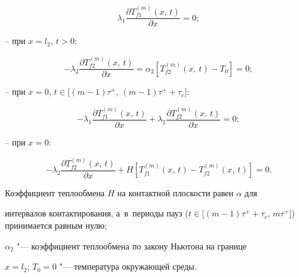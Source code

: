 \begin{equation}

\lambda _1 \frac{\partial T_{f1}^{(m)} (x,\,t)}{\partial x} = 0;

\end{equation}



-- при $x = l_2$, $t > 0$:



\begin{equation}

\label{evdok:eq2}

 - \lambda _2 \frac{\partial T_{f2}^{(m)} (x,\,t)}{\partial x} = \alpha _2 \left[T_{f2}^{(m)} (x,\,t) - T_0 \right] = 0;

\end{equation}



-- при $x = 0$, $t \in \big[(m - 1)\tau ^ +,\, (m - 1)\tau ^ + + \tau _c \big]$:

\begin{equation}

\label{evdok:eq3}

 - \lambda _1 \frac{\partial T_{f1}^{(m)} (x,\,t)}{\partial x} + 

\lambda _2 \frac{\partial T_{f2}^{(m)} (x,\,t)}{\partial x} = 0;

\end{equation}



-- при $x =0$:

\begin{equation}

\label{evdok:eq4}

 - \lambda _2 \frac{\partial T_{f2}^{(m)} (x,\,t)}{\partial x} + 

H\left[T_{f1}^{(m)} (x,\,t) - T_{f2}^{(m)} (x,\,t)\right] = 0.

\end{equation}

Коэффициент теплообмена $H$ на контактной плоскости равен $\alpha $ для 

интервалов контактирования, а~в~периоды пауз ($t \in \big[(m - 1)\tau ^ + + 

\tau _c,\, m\tau ^ + \big]$) принимается  равным нулю;

$\alpha _2$ "--- коэффициент теплообмена по закону Ньютона на границе 

$x = l_2$; $T_0 = 0$ "--- температура окружающей среды.



